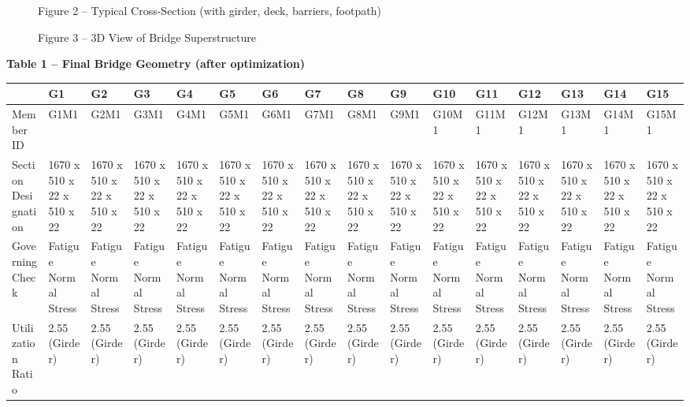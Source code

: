 \documentclass[12pt,a4paper]{report}
\numberwithin{table}{chapter}
\numberwithin{figure}{chapter}
\begin{document}
\newpage

\begin{figure}[H]
\centering
{}
\caption*{Figure 2 -- Typical Cross-Section (with girder, deck, barriers, footpath)}
\end{figure}

\begin{figure}[H]
\centering
{}
\caption*{Figure 3 -- 3D View of Bridge Superstructure}
\end{figure}

\noindent\textbf{Table 1 -- Final Bridge Geometry (after optimization)}

\vspace{0.4em}
\noindent
\begin{tabular}{|C{2.8cm}|C{1.5cm}|C{1.5cm}|C{1.5cm}|C{1.5cm}|C{1.5cm}|C{1.5cm}|C{1.5cm}|C{1.5cm}|C{1.5cm}|C{1.5cm}|C{1.5cm}|C{1.5cm}|C{1.5cm}|C{1.5cm}|C{1.5cm}|}
\hline
  \textbf{} &
  \textbf{G1} &
  \textbf{G2} &
  \textbf{G3} &
  \textbf{G4} &
  \textbf{G5} &
  \textbf{G6} &
  \textbf{G7} &
  \textbf{G8} &
  \textbf{G9} &
  \textbf{G10} &
  \textbf{G11} &
  \textbf{G12} &
  \textbf{G13} &
  \textbf{G14} &
  \textbf{G15} \\
\hline
Member ID & G1M1 & G2M1 & G3M1 & G4M1 & G5M1 & G6M1 & G7M1 & G8M1 & G9M1 & G10M1 & G11M1 & G12M1 & G13M1 & G14M1 & G15M1 \\
\hline
Section Designation & 1670 x 510 x 22 x 510 x 22 & 1670 x 510 x 22 x 510 x 22 & 1670 x 510 x 22 x 510 x 22 & 1670 x 510 x 22 x 510 x 22 & 1670 x 510 x 22 x 510 x 22 & 1670 x 510 x 22 x 510 x 22 & 1670 x 510 x 22 x 510 x 22 & 1670 x 510 x 22 x 510 x 22 & 1670 x 510 x 22 x 510 x 22 & 1670 x 510 x 22 x 510 x 22 & 1670 x 510 x 22 x 510 x 22 & 1670 x 510 x 22 x 510 x 22 & 1670 x 510 x 22 x 510 x 22 & 1670 x 510 x 22 x 510 x 22 & 1670 x 510 x 22 x 510 x 22 \\
\hline
Governing Check & Fatigue Normal Stress & Fatigue Normal Stress & Fatigue Normal Stress & Fatigue Normal Stress & Fatigue Normal Stress & Fatigue Normal Stress & Fatigue Normal Stress & Fatigue Normal Stress & Fatigue Normal Stress & Fatigue Normal Stress & Fatigue Normal Stress & Fatigue Normal Stress & Fatigue Normal Stress & Fatigue Normal Stress & Fatigue Normal Stress \\
\hline
Utilization Ratio & 2.55 (Girder) & 2.55 (Girder) & 2.55 (Girder) & 2.55 (Girder) & 2.55 (Girder) & 2.55 (Girder) & 2.55 (Girder) & 2.55 (Girder) & 2.55 (Girder) & 2.55 (Girder) & 2.55 (Girder) & 2.55 (Girder) & 2.55 (Girder) & 2.55 (Girder) & 2.55 (Girder) \\
\hline
\end{tabular}
\end{document}
